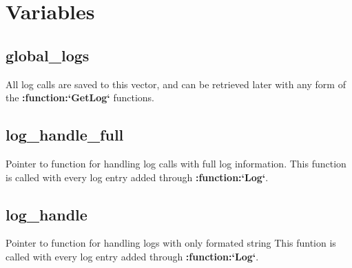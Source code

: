 \documentclass[letterpaper,10pt,english]{sphinxmanual}
\begin{document}
\section{Variables}
\label{\detokenize{log:variables}}

\subsection{global\_logs}
\label{\detokenize{log:global-logs}}

\begin{fulllineitems}
\label{\detokenize{log:_CPPv2N6pessum11global_logsE}}%
\pysigstartmultiline
{}%
\pysigstopmultiline
All log calls are saved to this vector, and can be retrieved later with any
form of the {\color{red}\bfseries{}:function:{}`GetLog{}`} functions.

\end{fulllineitems}



\subsection{log\_handle\_full}
\label{\detokenize{log:log-handle-full}}

\begin{fulllineitems}
\label{\detokenize{log:_CPPv2N6pessum15log_handle_fullE}}%
\pysigstartmultiline
{}%
\pysigstopmultiline
Pointer to function for handling log calls with full log information.
This function is called with every log entry added through {\color{red}\bfseries{}:function:{}`Log{}`}.

\end{fulllineitems}



\subsection{log\_handle}
\label{\detokenize{log:log-handle}}

\begin{fulllineitems}
\label{\detokenize{log:_CPPv2N6pessum10log_handleE}}%
\pysigstartmultiline
{}%
\pysigstopmultiline
Pointer to function for handling logs with only formated string
This funtion is called with every log entry added through {\color{red}\bfseries{}:function:{}`Log{}`}.

\end{fulllineitems}
\end{document}
